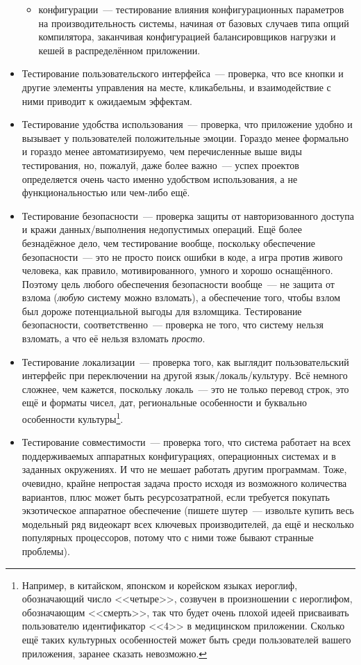 \documentclass{../../text-style}
\begin{document}
\begin{itemize}
\begin{itemize}
        \item конфигурации~--- тестирование влияния конфигурационных параметров на производительность системы, начиная от базовых случаев типа опций компилятора, заканчивая конфигурацией балансировщиков нагрузки и кешей в распределённом приложении.
    \end{itemize}
    \item Тестирование пользовательского интерфейса~--- проверка, что все кнопки и другие элементы управления на месте, кликабельны, и взаимодействие с ними приводит к ожидаемым эффектам.
    \item Тестирование удобства использования~--- проверка, что приложение удобно и вызывает у пользователей положительные эмоции. Гораздо менее формально и гораздо менее автоматизируемо, чем перечисленные выше виды тестирования, но, пожалуй, даже более важно~--- успех проектов определяется очень часто именно удобством использования, а не функциональностью или чем-либо ещё.
    \item Тестирование безопасности~--- проверка защиты от навторизованного доступа и кражи данных/выполнения недопустимых операций. Ещё более безнадёжное дело, чем тестирование вообще, поскольку обеспечение безопасности~--- это не просто поиск ошибки в коде, а игра против живого человека, как правило, мотивированного, умного и хорошо оснащённого. Поэтому цель любого обеспечения безопасности вообще~--- не защита от взлома (\emph{любую} систему можно взломать), а обеспечение того, чтобы взлом был дороже потенциальной выгоды для взломщика. Тестирование безопасности, соответственно~--- проверка не того, что систему нельзя взломать, а что её нельзя взломать \emph{просто}.
    \item Тестирование локализации~--- проверка того, как выглядит пользовательский интерфейс при переключении на другой язык/локаль/культуру. Всё немного сложнее, чем кажется, поскольку локаль~--- это не только перевод строк, это ещё и форматы чисел, дат, региональные особенности и буквально особенности культуры\footnote{Например, в китайском, японском и корейском языках иероглиф, обозначающий число <<четыре>>, созвучен в произношении с иероглифом, обозначающим <<смерть>>, так что будет очень плохой идеей присваивать пользователю идентификатор <<4>> в медицинском приложении. Сколько ещё таких культурных особенностей может быть среди пользователей вашего приложения, заранее сказать невозможно.}.
    \item Тестирование совместимости~--- проверка того, что система работает на всех поддерживаемых аппаратных конфигурациях, операционных системах и в заданных окружениях. И что не мешает работать другим программам. Тоже, очевидно, крайне непростая задача просто исходя из возможного количества вариантов, плюс может быть ресурсозатратной, если требуется покупать экзотическое аппаратное обеспечение (пишете шутер~--- извольте купить весь модельный ряд видеокарт всех ключевых производителей, да ещё и несколько популярных процессоров, потому что с ними тоже бывают странные проблемы).
\end{itemize}
\end{document}
